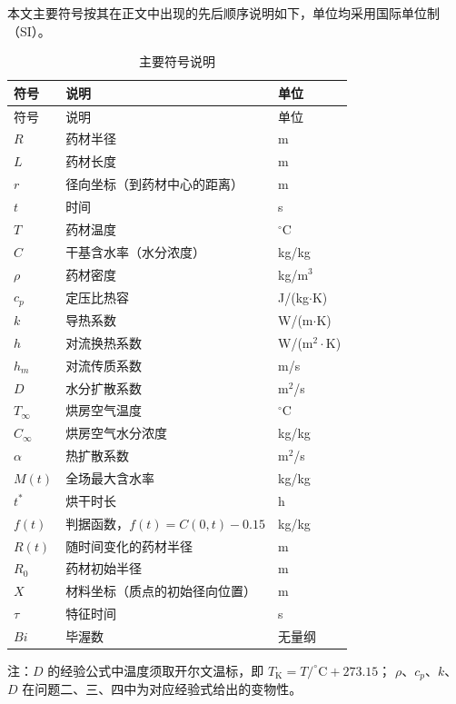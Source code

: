 \documentclass[12pt,a4paper]{article}
\begin{document}
本文主要符号按其在正文中出现的先后顺序说明如下，单位均采用国际单位制（SI）。
\begin{longtable}{>{\centering\arraybackslash}p{3cm}
                  >{\centering\arraybackslash}p{8cm}
                  >{\centering\arraybackslash}p{2cm}}
\caption{主要符号说明}
\label{tab:symbols}\\
\toprule
符号 & 说明 & 单位\\
\midrule
\endfirsthead

\toprule
符号 & 说明 & 单位\\
\midrule
\endhead

\bottomrule
\endlastfoot

$R$         & 药材半径 & m \\
$L$         & 药材长度 & m \\
$r$         & 径向坐标（到药材中心的距离） & m \\
$t$         & 时间 & s \\
$T$         & 药材温度 & $^\circ$C \\
$C$         & 干基含水率（水分浓度） & kg/kg \\
$\rho$      & 药材密度 & kg/m$^3$ \\
$c_p$       & 定压比热容 & J/(kg$\cdot$K) \\
$k$         & 导热系数 & W/(m$\cdot$K) \\
$h$         & 对流换热系数 & W/(m$^2\cdot$K) \\
$h_m$       & 对流传质系数 & m/s \\
$D$         & 水分扩散系数 & m$^2$/s \\
$T_\infty$  & 烘房空气温度 & $^\circ$C \\
$C_\infty$  & 烘房空气水分浓度 & kg/kg \\
$\alpha$    & 热扩散系数 & m$^2$/s \\
$M(t)$      & 全场最大含水率 & kg/kg \\
$t^{*}$     & 烘干时长 & h \\
$f(t)$      & 判据函数，$f(t)=C(0,t)-0.15$ & kg/kg \\
$R(t)$      & 随时间变化的药材半径 & m \\
$R_0$       & 药材初始半径 & m \\
$X$         & 材料坐标（质点的初始径向位置） & m \\
$\tau$      & 特征时间 & s \\
$Bi$        & 毕渥数 & 无量纲 \\

\end{longtable}
注：$D$ 的经验公式中温度须取开尔文温标，即 $T_{\mathrm{K}}=T/^\circ\mathrm{C}+273.15$；
$\rho$、$c_p$、$k$、$D$ 在问题二、三、四中为对应经验式给出的变物性。
\end{document}
